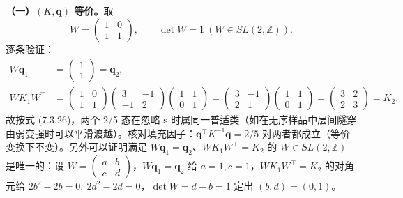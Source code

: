 \textbf{（一）$(K,\pmb{q})$ 等价。}取
\begin{equation*}
W=\begin{pmatrix}1&0\\1&1\end{pmatrix},\qquad \det W=1\ (W\in SL(2,\mathbb Z)).
\end{equation*}
逐条验证：
\begin{align*}
W\pmb{q}_1&=\begin{pmatrix}1\\1\end{pmatrix}=\pmb{q}_2,\\
W K_1 W^{\top}&=\begin{pmatrix}1&0\\1&1\end{pmatrix}
\begin{pmatrix}3&-1\\-1&2\end{pmatrix}
\begin{pmatrix}1&1\\0&1\end{pmatrix}
=\begin{pmatrix}3&-1\\2&1\end{pmatrix}
\begin{pmatrix}1&1\\0&1\end{pmatrix}
=\begin{pmatrix}3&2\\2&3\end{pmatrix}=K_2 .
\end{align*}
故按式 (7.3.26)，两个 2/5 态在忽略 $\pmb{s}$ 时属同一普适类（如在无序样品中层间隧穿由弱变强时可以平滑渡越）。核对填充因子：$\pmb{q}^{\top}K^{-1}\pmb{q}=2/5$ 对两者都成立（等价变换下不变）。另外可以证明满足 $W\pmb{q}_1=\pmb{q}_2$、$WK_1W^{\top}=K_2$ 的 $W\in SL(2,\mathbb Z)$ 是唯一的：设 $W=\begin{pmatrix}a&b\\c&d\end{pmatrix}$，$W\pmb{q}_1=\pmb{q}_2$ 给 $a=1,c=1$，$WK_1W^{\top}=K_2$ 的对角元给 $2b^2-2b=0,\ 2d^2-2d=0$，$\det W=d-b=1$ 定出 $(b,d)=(0,1)$。

